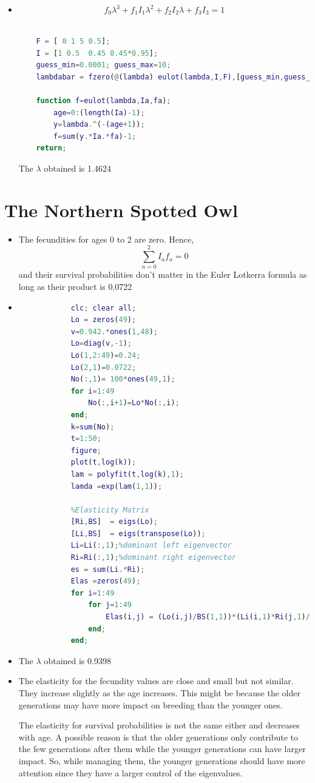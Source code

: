 \documentclass[a4paper]{article}
\begin{document}
\begin{itemize}
 	\item   	
 	\[ f_0\lambda^3 +f_1 I_1 \lambda^2 +f_2 I_2 \lambda +f_3 I_3= 1\]
 	\begin{lstlisting}[language=Matlab,frame=single]
 
 	F = [ 0 1 5 0.5];
 	I = [1 0.5  0.45 0.45*0.95];
 	guess_min=0.0001; guess_max=10;
 	lambdabar = fzero(@(lambda) eulot(lambda,I,F),[guess_min,guess_max]);
 	
 	function f=eulot(lambda,Ia,fa);
	 	age=0:(length(Ia)-1);
	 	y=lambda.^(-(age+1));
	 	f=sum(y.*Ia.*fa)-1;
 	return;
 	\end{lstlisting}
 	
 	The $\lambda$ obtained is 1.4624
 \end{itemize}



\section{The Northern Spotted Owl}

\begin{itemize}
	\item The fecundities for ages 0 to 2 are zero. Hence,
	\[ \sum_{n=0}^{2}  I_a f_a =0     \] 
	and their survival probabilities don't matter in the Euler Lotkerra formula as long as their product is 0.0722
	\item 
	 	\begin{lstlisting}[language=Matlab,frame=single]
			%% Problem Set 1 - Owls
			clc; clear all;
			Lo = zeros(49);
			v=0.942.*ones(1,48);
			Lo=diag(v,-1);
			Lo(1,2:49)=0.24;
			Lo(2,1)=0.0722;
			No(:,1)= 100*ones(49,1);
			for i=1:49
				No(:,i+1)=Lo*No(:,i);
			end;
			k=sum(No);
			t=1:50;
			figure;
			plot(t,log(k));
			lam = polyfit(t,log(k),1);
			lamda =exp(lam(1,1));
			
			%Elasticity Matrix
			[Ri,BS]  = eigs(Lo);
			[Li,BS]  = eigs(transpose(Lo));
			Li=Li(:,1);%dominant left eigenvector
			Ri=Ri(:,1);%dominant right eigenvector
			es = sum(Li.*Ri);
			Elas =zeros(49);
			for i=1:49
				for j=1:49
					Elas(i,j) = (Lo(i,j)/BS(1,1))*(Li(i,1)*Ri(j,1)/es);
				end;
			end;
	 	\end{lstlisting}
	 	
	 	
	 	\item 
	 	The $\lambda$ obtained is 0.9398
	 	\item The elasticity for the fecundity values are close and small but not similar. They increase slightly as the age increases. This might be because the older generations may have more impact on breeding than the younger ones.
	 	
	 	The elasticity for survival probabilities is not the same either and decreases with age. A possible reason is that the older generations only contribute to the few generations after them while the younger generations can have larger impact. So, while managing them, the younger generations should have more attention since they have a larger control of the eigenvalues.
\end{itemize}
\end{document}
